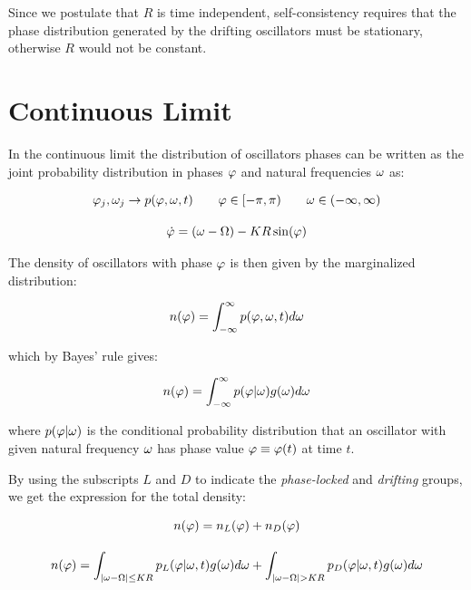 Since we postulate that $R$ is time independent, self-consistency requires that the phase distribution generated by the drifting
oscillators must be stationary, otherwise $R$ would not be constant.

\section{Continuous Limit}

In the continuous limit the distribution of oscillators phases can be written as the joint probability distribution in phases
$\varphi$ and natural frequencies $\omega$ as:

\begin{gather}
    \varphi_j, \omega_j \to p(\varphi, \omega,t) \qquad \varphi \in [-\pi, \pi) \qquad \omega \in (-\infty, \infty) \notag\\[10pt]
    \dot{\varphi} = (\omega - \Omega) - K R \sin(\varphi)
    \label{eqmotioncontinuous}
\end{gather}

\noindent The density of oscillators with phase $\varphi$ is then given by the marginalized distribution:

\begin{align*}
    n(\varphi) = \int_{-\infty}^{\infty} p(\varphi, \omega,t) d\omega
\end{align*}

\noindent which by Bayes' rule gives:

\begin{align*}
    n(\varphi) = \int_{-\infty}^{\infty} p(\varphi | \omega)g(\omega) d\omega
\end{align*}

\noindent where $p(\varphi|\omega)$ is the conditional probability distribution that an oscillator with given natural frequency
$\omega$ has phase value $\varphi \equiv \varphi(t)$ at time $t$.

By using the subscripts $L$ and $D$ to indicate the \textit{phase-locked} and \textit{drifting} groups, we get the expression for the
total density:

\begin{gather}
    n(\varphi) = n_L(\varphi) + n_D(\varphi) \notag\\[10pt]
    n(\varphi) = \int_{|\omega - \Omega|\leq K R} p_L(\varphi|\omega,t) g(\omega) d\omega + \int_{|\omega - \Omega| > K R} p_D(\varphi|\omega,t) g(\omega) d\omega
    \label{density}
\end{gather}

